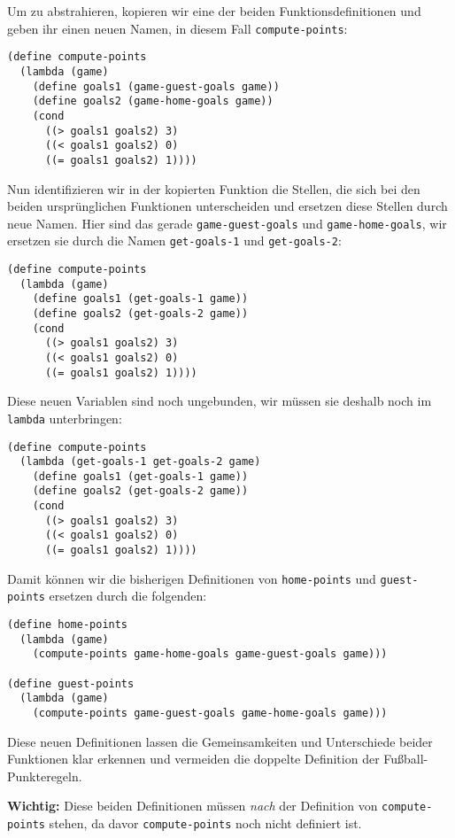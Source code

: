 \noindent Um zu abstrahieren, kopieren wir eine der beiden Funktionsdefinitionen und
geben ihr einen neuen Namen, in diesem Fall \lstinline{compute-points}:
%
\begin{lstlisting}
(define compute-points
  (lambda (game)
    (define goals1 (game-guest-goals game))
    (define goals2 (game-home-goals game))
    (cond
      ((> goals1 goals2) 3)
      ((< goals1 goals2) 0)
      ((= goals1 goals2) 1))))
\end{lstlisting}
%
Nun identifizieren wir in der kopierten Funktion die Stellen, die sich
bei den beiden ursprünglichen Funktionen unterscheiden und ersetzen
diese Stellen durch neue Namen.  Hier sind das gerade
\lstinline{game-guest-goals} und \lstinline{game-home-goals}, wir
ersetzen sie durch die Namen \lstinline{get-goals-1} und
\lstinline{get-goals-2}:
%
\begin{lstlisting}
(define compute-points
  (lambda (game)
    (define goals1 (get-goals-1 game))
    (define goals2 (get-goals-2 game))
    (cond
      ((> goals1 goals2) 3)
      ((< goals1 goals2) 0)
      ((= goals1 goals2) 1))))
\end{lstlisting}
%
Diese neuen Variablen sind noch ungebunden, wir müssen sie deshalb
noch im \lstinline{lambda} unterbringen:
%
\begin{lstlisting}
(define compute-points
  (lambda (get-goals-1 get-goals-2 game)
    (define goals1 (get-goals-1 game))
    (define goals2 (get-goals-2 game))
    (cond
      ((> goals1 goals2) 3)
      ((< goals1 goals2) 0)
      ((= goals1 goals2) 1))))
\end{lstlisting}
%
Damit können wir die bisherigen Definitionen von
\lstinline{home-points} und \lstinline{guest-points} ersetzen durch
die folgenden:
%
\begin{lstlisting}
(define home-points
  (lambda (game)
    (compute-points game-home-goals game-guest-goals game)))

(define guest-points
  (lambda (game)
    (compute-points game-guest-goals game-home-goals game)))
\end{lstlisting}
%
Diese neuen Definitionen lassen die Gemeinsamkeiten und Unterschiede
beider Funktionen klar erkennen und vermeiden die doppelte Definition
der Fußball-Punkteregeln.

\textbf{Wichtig:} Diese beiden Definitionen müssen \emph{nach} der
Definition von \texttt{compute-points} stehen, da davor
\texttt{compute-points} noch nicht definiert ist.

